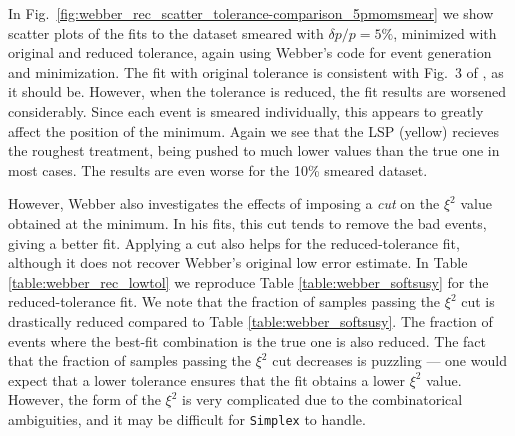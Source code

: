 \documentclass[twoside,english]{uiofysmaster}
\begin{document}
In Fig.\ \ref{fig:webber_rec_scatter_tolerance-comparison_5pmomsmear} we show scatter plots of the fits to the dataset smeared with $\delta p/p = 5\%$, minimized with original and reduced tolerance, again using Webber's code for event generation and minimization. The fit with original tolerance is consistent with Fig.\ 3 of \cite{Webber:2009vm}, as it should be. However, when the tolerance is reduced, the fit results are worsened considerably. Since each event is smeared individually, this appears to greatly affect the position of the minimum. Again we see that the LSP (yellow) recieves the roughest treatment, being pushed to much lower values than the true one in most cases. The results are even worse for the 10\% smeared dataset. 






However, Webber also investigates the effects of imposing a {\it cut} on the $\xi^2$ value obtained at the minimum. In his fits, this cut tends to remove the bad events, giving a better fit. Applying a cut also helps for the reduced-tolerance fit, although it does not recover Webber's original low error estimate. In Table \ref{table:webber_rec_lowtol} we reproduce Table \ref{table:webber_softsusy} for the reduced-tolerance fit. We note that the fraction of samples passing the $\xi^2$ cut is drastically reduced compared to Table \ref{table:webber_softsusy}. The fraction of events where the best-fit combination is the true one is also reduced. The fact that the fraction of samples passing the $\xi^2$ cut decreases is puzzling --- one would expect that a lower tolerance ensures that the fit obtains a lower $\xi^2$ value. However, the form of the $\xi^2$ is very complicated due to the combinatorical ambiguities, and it may be difficult for {\tt Simplex} to handle.
\end{document}
